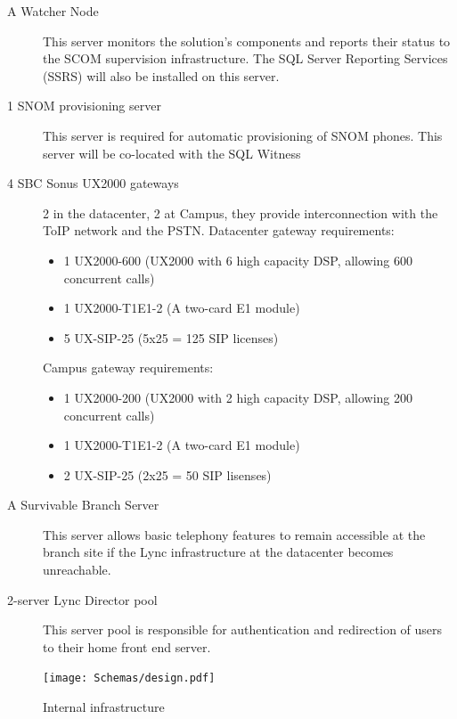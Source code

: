 \begin{description}
		\item[A Watcher Node] This server monitors the solution's components and reports their status to the SCOM supervision infrastructure. The SQL Server Reporting Services (SSRS) will also be installed on this server.
		
		\item[1 SNOM provisioning server] This server is required for automatic provisioning of SNOM phones. This server will be co-located with the SQL Witness
		
		\item[4 SBC Sonus UX2000 gateways] 2 in the datacenter, 2 at Campus, they provide interconnection with the ToIP network and the PSTN.
		Datacenter gateway requirements:
		\begin{itemize}
			\item 1 UX2000-600 (UX2000 with 6 high capacity DSP, allowing 600 concurrent calls)
			\item 1 UX2000-T1E1-2 (A two-card E1 module)
			\item 5 UX-SIP-25 (5x25 = 125 SIP licenses)
		\end{itemize}
		Campus gateway requirements:
		\begin{itemize}
			\item 1 UX2000-200 (UX2000 with 2 high capacity DSP, allowing 200 concurrent calls)
			\item 1 UX2000-T1E1-2 (A two-card E1 module)
			\item 2 UX-SIP-25 (2x25 = 50 SIP lisenses)
		\end{itemize}
		
		
		\item[A Survivable Branch Server] This server allows basic telephony features to remain accessible at the branch site if the Lync infrastructure at the datacenter becomes unreachable.
		
		
		\item[2-server Lync Director pool] This server pool is responsible for authentication and redirection of users to their home front end server.
		
	\end{description}

\begin{figure}[H]
	\centering
	\texttt{[image: Schemas/design.pdf]}
	\caption{Internal infrastructure}
	\label{fig:case_internal}
\end{figure}


